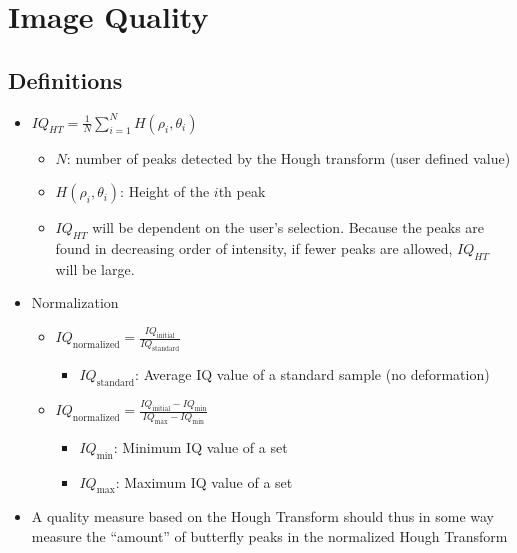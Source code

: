 \documentclass[letterpaper]{article}
\begin{document}
	\section{Image Quality}
		\subsection{Definitions}
			\begin{itemize}
				\item $IQ_{HT} = \frac{1}{N} \sum\limits_{i=1}^N {H(\rho_i, \theta_i)}$ \cite{Wright2006}
					\begin{itemize}
						\item $N$: number of peaks detected by the Hough transform (user defined value)
						\item $H(\rho_i, \theta_i)$: Height of the $i$th peak
						\item $IQ_{HT}$ will be dependent on the user's selection. Because the peaks are found in decreasing order of intensity, if fewer peaks are allowed, $IQ_{HT}$ will be large.
					\end{itemize}
				\item Normalization \cite{Wright2006}
					\begin{itemize}
						\item $IQ_{\text{normalized}} = \frac{IQ_{\text{initial}}}{IQ_{\text{standard}}}$
							\begin{itemize}
								\item $IQ_{\text{standard}}$: Average IQ value of a standard sample (no deformation)
							\end{itemize}
						\item $IQ_{\text{normalized}} = \frac{IQ_{\text{initial}} - IQ_{\text{min}}}{IQ_{\text{max}} - IQ_{\text{min}}}$
							\begin{itemize}
								\item $IQ_{\text{min}}$: Minimum IQ value of a set
								\item $IQ_{\text{max}}$: Maximum IQ value of a set
							\end{itemize}
					\end{itemize}
				\item A quality measure based on the Hough Transform should thus in some way measure the ``amount'' of butterfly peaks in the normalized Hough Transform \cite{KriegerLassen1994}
			\end{itemize}
		
\end{document}
